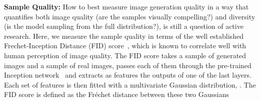 \documentclass[10pt]{article} \usepackage[accepted]{tmlr}
\begin{document}
\textbf{Sample Quality:} How to best measure image generation quality in a way that quantifies both image quality (are the samples visually compelling?) and diversity (is the model sampling from the full distribution?), is still a question of active research. Here, we measure the sample quality in terms of the well established Frechet-Inception Distance (FID) score~\citep{FID_Heusel}, which is known to correlate well with human perception of image quality. The FID score takes a sample of generated images and a sample of real images, passes each of them through the pre-trained Inception network~\citep{SzegedyVISW16} and extracts as features the outputs of one of the last layers. Each set of features is then fitted with a multivariate Gaussian distribution, . The FID score is defined as the Fréchet distance between these two Gaussians
\end{document}
